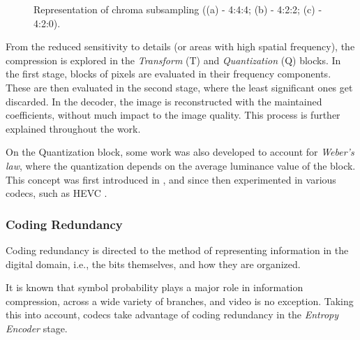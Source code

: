 \begin{figure}[h]
    \centering 
        \begin{subfigure}[c]{\textwidth}
            \centering
            
            \caption{}
            \label{subfig:444}
        \end{subfigure}
        \begin{subfigure}[c]{\textwidth}
            \centering
            
            \caption{}
            \label{subfig:422}
        \end{subfigure}
        \begin{subfigure}[c]{\textwidth}
            \centering
            
            \caption{}
            \label{subfig:420}
        \end{subfigure}
       \caption{Representation of chroma subsampling ((a) - 4:4:4; (b) - 4:2:2; (c) - 4:2:0).}
    \label{fig:subsample}
\end{figure}

From the reduced sensitivity to details (or areas with high spatial frequency), the compression is explored in the \emph{Transform} (T) and \emph{Quantization} (Q) blocks. In the first stage, blocks of pixels are evaluated in their frequency components. These are then evaluated in the second stage, where the least significant ones get discarded. In the decoder, the image is reconstructed with the maintained coefficients, without much impact to the image quality. This process is further explained throughout the work.

On the Quantization block, some work was also developed to account for \emph{Weber's law}, where the quantization depends on the average luminance value of the block. This concept was first introduced in \cite{watsonEfficiencyModelHuman1988}, and since then experimented in various codecs, such as HEVC \cite{rouisPerceptualVideoContent2018}.

\subsubsection{Coding Redundancy}

Coding redundancy is directed to the method of representing information in the digital domain, i.e., the bits themselves, and how they are organized.

It is known that symbol probability plays a major role in information compression, across a wide variety of branches, and video is no exception. Taking this into account, codecs take advantage of coding redundancy in the \emph{Entropy Encoder} stage.

